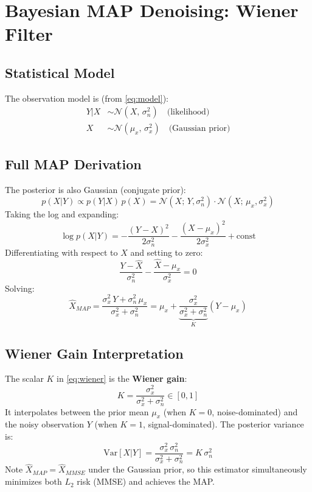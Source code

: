 \documentclass[10pt,conference]{IEEEtran}
\begin{document}
\section{Bayesian MAP Denoising: Wiener Filter}

\subsection{Statistical Model}
The observation model is (from \eqref{eq:model}):
\begin{align}
Y | X &\sim \mathcal{N}(X,\, \sigma_n^2) \quad \text{(likelihood)}\\
X &\sim \mathcal{N}(\mu_x,\, \sigma_x^2) \quad \text{(Gaussian prior)}
\end{align}

\subsection{Full MAP Derivation}
The posterior is also Gaussian (conjugate prior):
\begin{equation}
p(X|Y) \propto p(Y|X)\,p(X) = \mathcal{N}(X;\,Y,\sigma_n^2)\cdot\mathcal{N}(X;\,\mu_x,\sigma_x^2)
\end{equation}
Taking the log and expanding:
\begin{equation}
\log p(X|Y) = -\frac{(Y-X)^2}{2\sigma_n^2} - \frac{(X-\mu_x)^2}{2\sigma_x^2} + \text{const}
\end{equation}
Differentiating with respect to $X$ and setting to zero:
\begin{equation}
\frac{Y - \hat{X}}{\sigma_n^2} - \frac{\hat{X} - \mu_x}{\sigma_x^2} = 0
\end{equation}
Solving:
\begin{equation}
\hat{X}_{MAP} = \frac{\sigma_x^2\, Y + \sigma_n^2\,\mu_x}{\sigma_x^2 + \sigma_n^2}
= \mu_x + \underbrace{\frac{\sigma_x^2}{\sigma_x^2 + \sigma_n^2}}_{K}(Y - \mu_x)
\label{eq:wiener}
\end{equation}

\subsection{Wiener Gain Interpretation}
The scalar $K$ in \eqref{eq:wiener} is the \textbf{Wiener gain}:
\begin{equation}
\boxed{K = \frac{\sigma_x^2}{\sigma_x^2 + \sigma_n^2} \in [0,1]}
\end{equation}
It interpolates between the prior mean $\mu_x$ (when $K=0$, noise-dominated) and the noisy observation $Y$ (when $K=1$, signal-dominated). The posterior variance is:
\begin{equation}
\mathrm{Var}[X|Y] = \frac{\sigma_x^2\,\sigma_n^2}{\sigma_x^2 + \sigma_n^2} = K\,\sigma_n^2
\end{equation}
Note $\hat{X}_{MAP} = \hat{X}_{MMSE}$ under the Gaussian prior, so this estimator simultaneously minimizes both $L_2$ risk (MMSE) and achieves the MAP.
\end{document}
